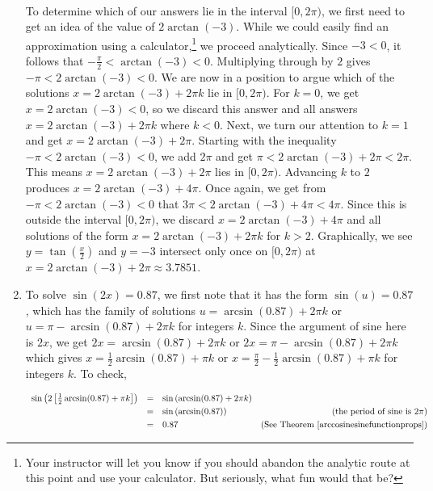 \begin{ex}
\begin{enumerate}
\[\begin{array}{rclr}
\end{array}\] 


 To determine which of our answers lie in the interval $[0,2\pi)$, we first need to get an idea of the value of $2\arctan(-3)$.  While we could easily find an approximation using a calculator,\footnote{Your instructor will let you know if you should abandon the analytic route at this point and use your calculator.  But seriously, what fun would that be?} we proceed analytically.  Since $-3 < 0$, it follows that $-\frac{\pi}{2} < \arctan(-3) < 0$.  Multiplying through by $2$ gives $-\pi < 2\arctan(-3) < 0$.   We are now in a position to argue which of the solutions $x = 2\arctan(-3) + 2\pi k$ lie in $[0,2\pi)$.  For $k = 0$, we get $x = 2\arctan(-3) < 0$, so we discard this answer and all answers $x = 2\arctan(-3) + 2\pi k$ where $k < 0$.  Next, we turn our attention to $k = 1$ and get $x = 2\arctan(-3) + 2\pi$. Starting with the inequality $-\pi < 2\arctan(-3) < 0$, we add $2\pi$  and get $\pi < 2\arctan(-3) +2\pi < 2\pi$.  This means $x = 2\arctan(-3) + 2\pi$ lies in $[0,2\pi)$.  Advancing $k$ to $2$ produces $x = 2\arctan(-3) + 4\pi$. Once again, we get from $-\pi < 2\arctan(-3) < 0$ that $3\pi < 2\arctan(-3) + 4\pi < 4\pi$.  Since this is outside the interval $[0,2\pi)$,  we discard $x = 2\arctan(-3) + 4\pi$ and all solutions of the form $x = 2\arctan(-3) + 2\pi k$ for $k > 2$.   Graphically, we see $y = \tan\left(\frac{x}{2}\right)$ and $y = -3$ intersect only once on $[0,2\pi)$ at $x = 2\arctan(-3) + 2\pi\approx 3.7851$.

\item To solve $\sin(2x) = 0.87$, we first note that it has the form $\sin(u) = 0.87$, which has the family of solutions $u = \arcsin(0.87) + 2\pi k$ or $u =\pi -  \arcsin(0.87) + 2\pi k$ for integers $k$. Since the argument of sine here is $2x$, we get $2x = \arcsin(0.87) + 2\pi k$ or $2x =\pi -  \arcsin(0.87) + 2\pi k$ which gives $x = \frac{1}{2} \arcsin(0.87) + \pi k$ or $x =\frac{\pi}{2} -  \frac{1}{2}\arcsin(0.87) + \pi k$ for integers $k$.  To check,

\[ \begin{array}{rclr}

\sin\left(2\left[\frac{1}{2} \arcsin(0.87) + \pi k\right]\right)  &  = & \sin\left(\arcsin(0.87) + 2\pi k\right)  & \\ [3pt]
																													& =  & \sin\left(\arcsin(0.87)\right) & \text{(the period of sine is $2\pi$)} \\ [3pt]
																												& =  & 0.87& (\text{See Theorem } \ref{arccosinesinefunctionprops})\\
																								

\end{array}\]
\end{enumerate}
\end{ex}
